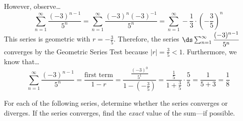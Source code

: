 \documentclass[12pt,letterpaper]{exam}
\begin{document}
\begin{questions}
{However, observe\dots
	\[
	\sum_{n=1}^\infty \dfrac{(-3)^{n-1}}{5^n}= \sum_{n=1}^\infty \dfrac{(-3)^n (-3)^{-1}}{5^n}= \sum_{n=1}^\infty -\dfrac{1}{3} \cdot \left( -\dfrac{3}{5} \right)^n
	\]
This series is geometric with $r= -\tfrac{3}{5}$. Therefore, the series $\ds\sum_{n=1}^\infty \dfrac{(-3)^{n-1}}{5^n}$ converges by the Geometric Series Test because $|r|= \tfrac{3}{5} < 1$. Furthermore, we know that\dots
	\[
	\sum_{n=1}^\infty \dfrac{(-3)^{n-1}}{5^n}= \dfrac{\text{first term}}{1 - r}= \dfrac{\tfrac{(-3)^0}{5^1}}{1 - \left(-\tfrac{3}{5} \right)}= \dfrac{\tfrac{1}{5}}{1 + \tfrac{3}{5}} \cdot \dfrac{5}{5}= \dfrac{1}{5 + 3}= \dfrac{1}{8}
	\]
}
	


\newpage
\question[16] For each of the following series, determine whether the series converges or diverges. If the series converges, find the \textit{exact} value of the sum---if possible. \par\vspace{0.3cm}
\end{questions}
\end{document}
